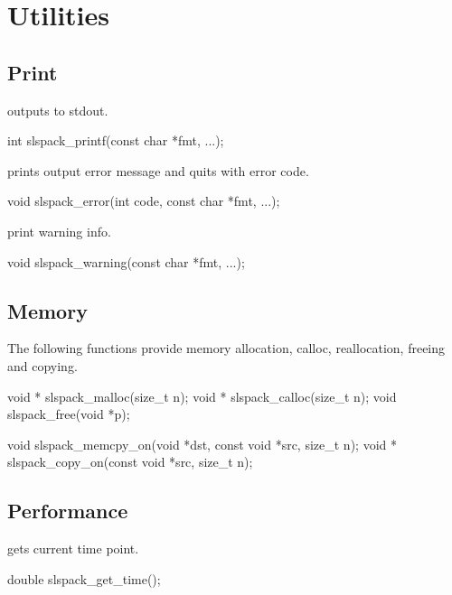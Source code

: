 \chapter{Utilities}

\section{Print}

 outputs to stdout.
\begin{evb}
int slspack_printf(const char *fmt, ...);
\end{evb}

 prints output error message and quits with error code.
\begin{evb}
void slspack_error(int code, const char *fmt, ...);
\end{evb}

 print warning info.
\begin{evb}
void slspack_warning(const char *fmt, ...);
\end{evb}

\section{Memory}
The following functions provide memory allocation, calloc, reallocation, freeing and copying.
\begin{evb}
void * slspack_malloc(size_t n);
void * slspack_calloc(size_t n);
void slspack_free(void *p);

void slspack_memcpy_on(void *dst, const void *src, size_t n);
void * slspack_copy_on(const void *src, size_t n);
\end{evb}

\section{Performance}

 gets current time point.
\begin{evb}
double slspack_get_time();
\end{evb}
